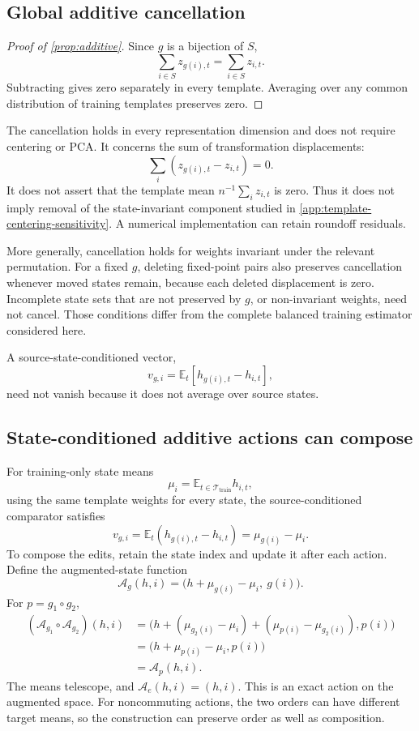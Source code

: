 \subsection{Global additive cancellation}
\label{app:global-cancellation-proof}

\begin{proof}[Proof of \cref{prop:additive}]
Since $g$ is a bijection of $S$,
\[
 \sum_{i\in S}z_{g(i),t}
 =
 \sum_{i\in S}z_{i,t}.
\]
Subtracting gives zero separately in every template.
Averaging over any common distribution of training
templates preserves zero.
\end{proof}

The cancellation holds in every representation dimension
and does not require centering or PCA.
It concerns the sum of transformation displacements:
\[
 \sum_i(z_{g(i),t}-z_{i,t})=0.
\]
It does not assert that the template mean
$n^{-1}\sum_i z_{i,t}$ is zero.
Thus it does not imply removal of the state-invariant
component studied in
\cref{app:template-centering-sensitivity}.
A numerical implementation can retain roundoff residuals.

More generally, cancellation holds for weights invariant
under the relevant permutation.
For a fixed $g$, deleting fixed-point pairs also preserves
cancellation whenever moved states remain, because each
deleted displacement is zero.
Incomplete state sets that are not preserved by $g$, or
non-invariant weights, need not cancel.
Those conditions differ from the complete balanced
training estimator considered here.

A source-state-conditioned vector,
\[
 v_{g,i}
 =\mathbb E_t[h_{g(i),t}-h_{i,t}],
\]
need not vanish because it does not average over source
states.


\subsection{State-conditioned additive actions can compose}
\label{app:additive-composition}

For training-only state means
\[
 \mu_i
 =\mathbb E_{t\in\mathcal T_{\mathrm{train}}}h_{i,t},
\]
using the same template weights for every state, the
source-conditioned comparator satisfies
\[
 v_{g,i}
 =\mathbb E_t(h_{g(i),t}-h_{i,t})
 =\mu_{g(i)}-\mu_i.
\]
To compose the edits, retain the state index and update
it after each action.
Define the augmented-state function
\[
 \mathcal A_g(h,i)
 =
 \bigl(h+\mu_{g(i)}-\mu_i,\ g(i)\bigr).
\]
For $p=g_1\circ g_2$,
\begin{align*}
 (\mathcal A_{g_1}\circ\mathcal A_{g_2})(h,i)
 &=
 \bigl(
 h+(\mu_{g_2(i)}-\mu_i)
   +(\mu_{p(i)}-\mu_{g_2(i)}),
 p(i)
 \bigr)\\
 &=
 \bigl(h+\mu_{p(i)}-\mu_i,p(i)\bigr)\\
 &=\mathcal A_p(h,i).
\end{align*}
The means telescope, and
$\mathcal A_e(h,i)=(h,i)$.
This is an exact action on the augmented space.
For noncommuting actions, the two orders can have
different target means, so the construction can preserve
order as well as composition.

